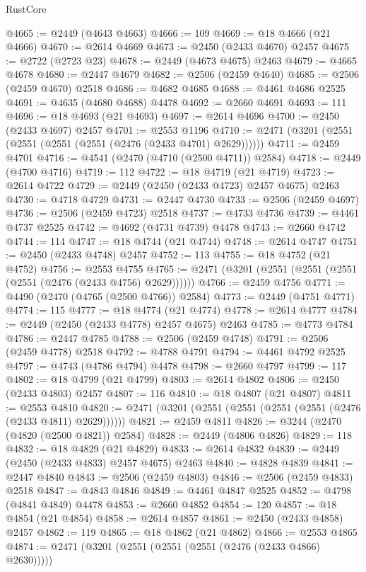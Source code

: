 \begin{lexlean}{RustCore}
\begin{coremodule}
@4665 := @2449 (@4643 @4663)
@4666 := 109
@4669 := @18 @4666 (@21 @4666)
@4670 := @2614 @4669
@4673 := @2450 (@2433 @4670) @2457
@4675 := @2722 (@2723 @23)
@4678 := @2449 (@4673 @4675) @2463
@4679 := @4665 @4678
@4680 := @2447 @4679
@4682 := @2506 (@2459 @4640)
@4685 := @2506 (@2459 @4670) @2518
@4686 := @4682 @4685
@4688 := @4461 @4686 @2525
@4691 := @4635 (@4680 @4688) @4478
@4692 := @2660 @4691
@4693 := 111
@4696 := @18 @4693 (@21 @4693)
@4697 := @2614 @4696
@4700 := @2450 (@2433 @4697) @2457
@4701 := @2553 @1196
@4710 := @2471 (@3201 (@2551 (@2551 (@2551 (@2551 (@2476 (@2433 @4701) @2629))))))
@4711 := @2459 @4701
@4716 := @4541 (@2470 (@4710 (@2500 @4711)) @2584)
@4718 := @2449 (@4700 @4716)
@4719 := 112
@4722 := @18 @4719 (@21 @4719)
@4723 := @2614 @4722
@4729 := @2449 (@2450 (@2433 @4723) @2457 @4675) @2463
@4730 := @4718 @4729
@4731 := @2447 @4730
@4733 := @2506 (@2459 @4697)
@4736 := @2506 (@2459 @4723) @2518
@4737 := @4733 @4736
@4739 := @4461 @4737 @2525
@4742 := @4692 (@4731 @4739) @4478
@4743 := @2660 @4742
@4744 := 114
@4747 := @18 @4744 (@21 @4744)
@4748 := @2614 @4747
@4751 := @2450 (@2433 @4748) @2457
@4752 := 113
@4755 := @18 @4752 (@21 @4752)
@4756 := @2553 @4755
@4765 := @2471 (@3201 (@2551 (@2551 (@2551 (@2551 (@2476 (@2433 @4756) @2629))))))
@4766 := @2459 @4756
@4771 := @4490 (@2470 (@4765 (@2500 @4766)) @2584)
@4773 := @2449 (@4751 @4771)
@4774 := 115
@4777 := @18 @4774 (@21 @4774)
@4778 := @2614 @4777
@4784 := @2449 (@2450 (@2433 @4778) @2457 @4675) @2463
@4785 := @4773 @4784
@4786 := @2447 @4785
@4788 := @2506 (@2459 @4748)
@4791 := @2506 (@2459 @4778) @2518
@4792 := @4788 @4791
@4794 := @4461 @4792 @2525
@4797 := @4743 (@4786 @4794) @4478
@4798 := @2660 @4797
@4799 := 117
@4802 := @18 @4799 (@21 @4799)
@4803 := @2614 @4802
@4806 := @2450 (@2433 @4803) @2457
@4807 := 116
@4810 := @18 @4807 (@21 @4807)
@4811 := @2553 @4810
@4820 := @2471 (@3201 (@2551 (@2551 (@2551 (@2551 (@2476 (@2433 @4811) @2629))))))
@4821 := @2459 @4811
@4826 := @3244 (@2470 (@4820 (@2500 @4821)) @2584)
@4828 := @2449 (@4806 @4826)
@4829 := 118
@4832 := @18 @4829 (@21 @4829)
@4833 := @2614 @4832
@4839 := @2449 (@2450 (@2433 @4833) @2457 @4675) @2463
@4840 := @4828 @4839
@4841 := @2447 @4840
@4843 := @2506 (@2459 @4803)
@4846 := @2506 (@2459 @4833) @2518
@4847 := @4843 @4846
@4849 := @4461 @4847 @2525
@4852 := @4798 (@4841 @4849) @4478
@4853 := @2660 @4852
@4854 := 120
@4857 := @18 @4854 (@21 @4854)
@4858 := @2614 @4857
@4861 := @2450 (@2433 @4858) @2457
@4862 := 119
@4865 := @18 @4862 (@21 @4862)
@4866 := @2553 @4865
@4874 := @2471 (@3201 (@2551 (@2551 (@2551 (@2476 (@2433 @4866) @2630)))))

\end{coremodule}
\end{lexlean}
